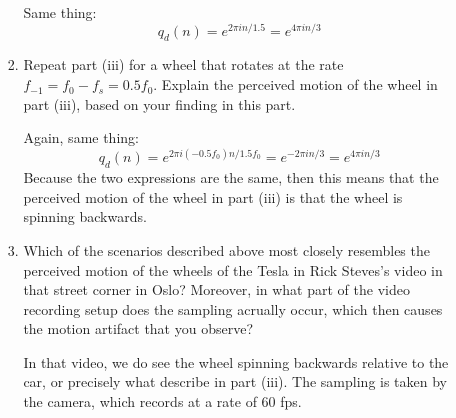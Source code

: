 \documentclass[10pt]{article}
\begin{document}
\begin{enumerate}[label=\alph*)]
\begin{enumerate}[label=\Roman*)]
\begin{enumerate}[label=\roman*)]
							\begin{solution}
								Same thing:
								\[
								q_d(n) = e^{2 \pi i n / 1.5} = e^{4 \pi i n / 3}
								\] 
							\end{solution}
						\item Repeat part (iii) for a wheel that rotates at the rate \( f_{-1} = f_0 - f_s = 
							0.5 f_0\). Explain the perceived motion of the wheel in part (iii), based on 
							your finding in this part. 

							\begin{solution}
								Again, same thing:
								\[
								q_d(n) = e^{2 \pi i (-0.5 f_0) n / 1.5f_0} = e^{-2 \pi i n / 3} = e^{4 \pi i n / 3}
								\] 
								Because the two expressions are the same, then this means that the perceived motion 
								of the wheel in part (iii) is that the wheel is spinning backwards. 
							\end{solution}
						\item Which of the scenarios described above most closely resembles the perceived motion 
							of the wheels of the Tesla in Rick Steves's video in that street corner in Oslo? 
							Moreover, in what part of the video recording setup does the sampling acrually occur, 
							which then causes the motion artifact that you observe?

							\begin{solution}
								In that video, we do see the wheel spinning backwards relative to the car, or 
								precisely what describe in part (iii). The sampling is taken by the camera, which 
								records at a rate of 60 fps. 
							\end{solution}
					\end{enumerate}
			\end{enumerate}
	\end{enumerate}
	\pagebreak
\end{document}
